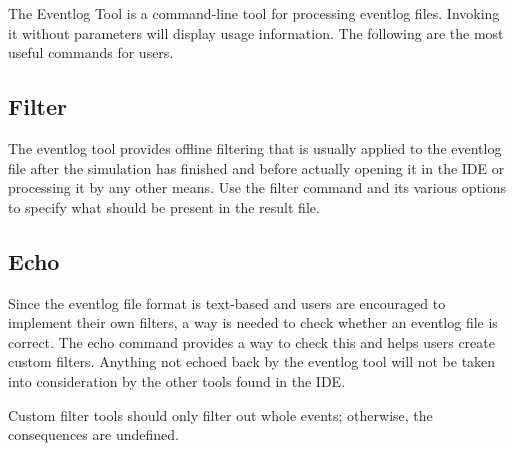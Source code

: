 The Eventlog Tool is a command-line tool for processing eventlog files. Invoking it without
parameters will display usage information. The following are the most useful commands for users.

\subsection{Filter}
\label{sec:eventlog:filter}

The eventlog tool provides offline filtering that is usually applied to the eventlog file
after the simulation has finished and before actually opening it in the {\opp} IDE
or processing it by any other means. Use the filter command and its various options to
specify what should be present in the result file.

\subsection{Echo}
\label{sec:eventlog:echo}

Since the eventlog file format is text-based and users are encouraged to implement their
own filters, a way is needed to check whether an eventlog file is
correct. The echo command provides a way to check this and helps users create custom
filters. Anything not echoed back by the eventlog tool will not be taken into
consideration by the other tools found in the {\opp} IDE.

\begin{note}
    Custom filter tools should only filter out whole events; otherwise, the
    consequences are undefined.
\end{note}

